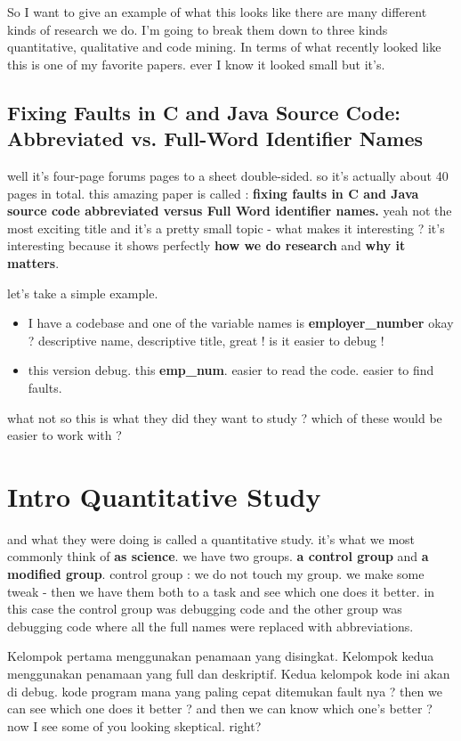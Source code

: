 \documentclass[14pt]{extreport}
\begin{document}

So I want to give an example of what this looks like there are many different kinds of research we do.
I'm going to break them down to three kinds quantitative, qualitative and code mining.
In terms of what recently looked like this is one of my favorite papers.
ever I know it looked small but it's.
\subsection{Fixing Faults in C and Java Source Code: Abbreviated vs. Full-Word Identifier Names}
well it's four-page forums pages to a sheet double-sided. 
so it's actually about 40 pages in total. 
this amazing paper is called  : 
\textbf{fixing faults in C and Java source code abbreviated versus Full Word identifier names.} 
yeah not the most exciting title and it's a pretty small topic - 
what makes it interesting ? 
it's interesting because it shows perfectly 
\textbf{how we do research}  and \textbf{why it matters}.
\par
let's take a simple example.
\begin{itemize}
	\item I have a codebase and one of the variable names is \textbf{employer\_number} okay ? descriptive name, descriptive title, great ! is it easier to debug !
	\item this version debug. this \textbf{emp\_num}. easier to read the code. easier to find faults.
\end{itemize}
what not so this is what they did they want to study ?
which of these would be easier to work with ? 
\section{Intro Quantitative Study} %
\label{sec:intro_quantitative_study}
and what they were doing is called a quantitative study.
it's what we most commonly think of \textbf{as science}. 
we have two groups. 
\textbf{a control group} and \textbf{a modified group}. 
control group : we do not touch my group. 
we make some tweak - then we have them both to a task
and see which one does it better.
in this case the control group was debugging code 
and the other group was debugging code where all the full names were
replaced with abbreviations. \par
Kelompok pertama menggunakan penamaan yang disingkat. 
Kelompok kedua menggunakan penamaan yang full dan deskriptif. 
Kedua kelompok kode ini akan di debug. 
kode program mana yang paling cepat ditemukan fault nya ?
then we can see which one does it better ? 
and then we can know which one's better ? 
now I see some of you looking skeptical. right? 
\par
\end{document}
